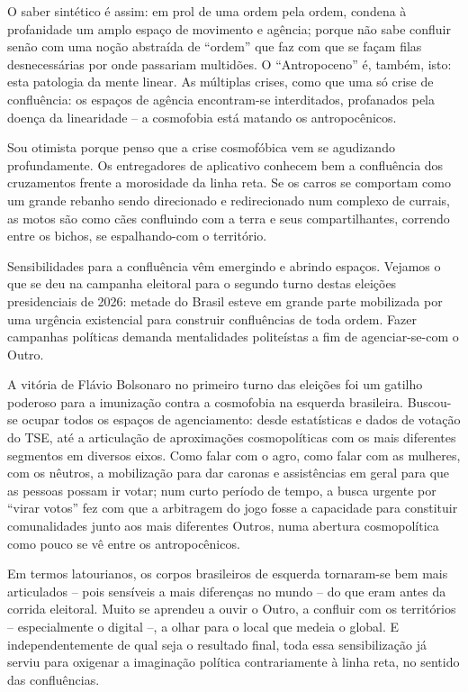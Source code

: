 O saber sintético é assim: em prol de uma ordem pela ordem, condena à profanidade um amplo espaço de movimento e agência; porque não sabe confluir senão com uma noção abstraída de \enquote{ordem} que faz com que se façam filas desnecessárias por onde passariam multidões. O \enquote{Antropoceno} é, também, isto: esta patologia da mente linear. As múltiplas crises, como que uma só crise de confluência: os espaços de agência encontram-se interditados, profanados pela doença da linearidade -- a cosmofobia está matando os antropocênicos.

Sou otimista porque penso que a crise cosmofóbica vem se agudizando profundamente. Os entregadores de aplicativo conhecem bem a confluência dos cruzamentos frente a morosidade da linha reta. Se os carros se comportam como um grande rebanho sendo direcionado e redirecionado num complexo de currais, as motos são como cães confluindo com a terra e seus compartilhantes, correndo entre os bichos, se espalhando-com o território.

Sensibilidades para a confluência vêm emergindo e abrindo espaços. Vejamos o que se deu na campanha eleitoral para o segundo turno destas eleições presidenciais de 2026: metade do Brasil esteve em grande parte mobilizada por uma urgência existencial para construir confluências de toda ordem. Fazer campanhas políticas demanda mentalidades politeístas a fim de agenciar-se-com o Outro.

A vitória de Flávio Bolsonaro no primeiro turno das eleições foi um gatilho poderoso para a imunização contra a cosmofobia na esquerda brasileira. Buscou-se ocupar todos os espaços de agenciamento: desde estatísticas e dados de votação do TSE, até a articulação de aproximações cosmopolíticas com os mais diferentes segmentos em diversos eixos. Como falar com o agro, como falar com as mulheres, com os nêutros, a mobilização para dar caronas e assistências em geral para que as pessoas possam ir votar; num curto período de tempo, a busca urgente por \enquote{virar votos} fez com que a arbitragem do jogo fosse a capacidade para constituir comunalidades junto aos mais diferentes Outros, numa abertura cosmopolítica como pouco se vê entre os antropocênicos.

Em termos latourianos, os corpos brasileiros de esquerda tornaram-se bem mais articulados -- pois sensíveis a mais diferenças no mundo -- do que eram antes da corrida eleitoral. Muito se aprendeu a ouvir o Outro, a confluir com os territórios -- especialmente o digital --, a olhar para o local que medeia o global. E independentemente de qual seja o resultado final, toda essa sensibilização já serviu para oxigenar a imaginação política contrariamente à linha reta, no sentido das confluências.

